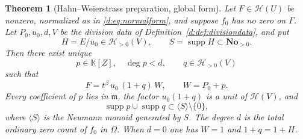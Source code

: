 \documentclass[11pt,a4paper]{article}
\numberwithin{equation}{section}
\newtheorem{theorem}{Theorem}[section]
\theoremstyle{definition}
\theoremstyle{remark}
\theoremstyle{plain}
\newcommand{\K}{\mathbb K}
\newcommand{\No}{\mathbf{No}}
\newcommand{\mm}{\mathfrak m}
\DeclareMathOperator{\supp}{supp}
\newcommand{\tm}{t}
\newcommand{\Hc}{\mathcal H}
\newcommand{\Neu}[1]{\langle #1\rangle}
\begin{document}
\begin{theorem}[Hahn--Weierstrass preparation, global form]
\label{d:thm:preparation}
Let $F\in\Hc(U)$ be nonzero, normalized as in
\eqref{d:eq:normalform}, and suppose $f_0$ has no zero on $\Gamma$.
Let $P_0,u_0,d,V$ be the division data of
Definition~\ref{d:def:divisiondata}, and put
\[
 H=E/u_0\in\Hc_{>0}(V),\qquad S=\supp H\subset\No_{>0}.
\]
Then there exist unique
\[
 p\in\K[Z],\quad \deg p<d,\qquad q\in\Hc_{>0}(V)
\]
such that
\begin{equation}\label{d:eq:preparation}
 F=\tm^{\beta}\,u_0\,(1+q)\,W,\qquad W=P_0+p .
\end{equation}
Every coefficient of $p$ lies in $\mm$, the factor $u_0(1+q)$ is a unit
of $\Hc(V)$, and
\[
 \supp p\cup\supp q\subset\Neu{S}\setminus\{0\},
\]
where $\Neu{S}$ is the Neumann monoid generated by $S$.  The degree
$d$ is the \emph{total} ordinary zero count of $f_0$ in $\Omega$.  When
$d=0$ one has $W=1$ and $1+q=1+H$.
\end{theorem}
\end{document}
